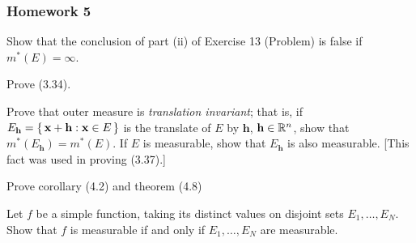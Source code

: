 \subsubsection{Homework 5}
\begin{problem}
  Show that the conclusion of part (ii) of Exercise 13 (Problem) is false
  if $m^*(E)=\infty$.
\end{problem}
\begin{solution}
\end{solution}

\begin{problem}
  Prove (3.34).
\end{problem}
\begin{solution}
\end{solution}

\begin{problem}
  Prove that outer measure is \emph{translation invariant}; that is, if
  $E_{\textbf{h}}=\left\{\,\mathbf{x}+\mathbf{h}:\mathbf{x}\in E\,\right\}$ is
  the translate of $E$ by $\mathbf{h}$, $\mathbf{h}\in\mathbb{R}^n$, show that
  $m^*(E_{\mathbf{h}})=m^*(E)$. If $E$ is measurable, show that
  $E_{\mathbf{h}}$ is also measurable. [This fact was used in proving
  (3.37).]
\end{problem}
\begin{solution}
\end{solution}

\begin{problem}
  Prove corollary (4.2) and theorem (4.8)
\end{problem}
\begin{solution}
\end{solution}

\begin{problem}
  Let $f$ be a simple function, taking its distinct values on disjoint sets
  $E_1,\ldots,E_N$. Show that $f$ is measurable if and only if
  $E_1,\ldots,E_N$ are measurable.
\end{problem}
\begin{solution}
\end{solution}

